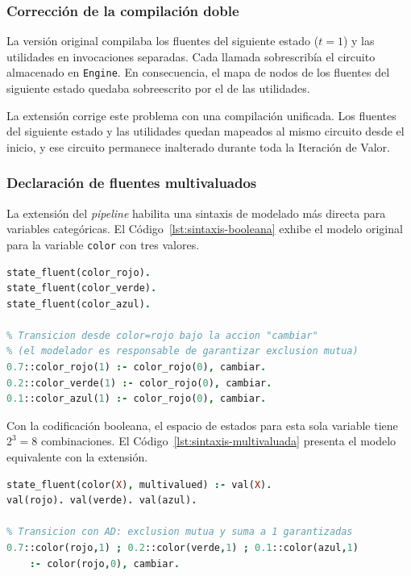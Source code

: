 \subsubsection{Corrección de la compilación doble}
\label{sec:di-compilacion-unica}

La versión original compilaba los fluentes del siguiente estado ($t = 1$) y las
utilidades en invocaciones separadas. Cada llamada sobrescribía el circuito
almacenado en \texttt{Engine}. En consecuencia, el mapa de nodos de los fluentes
del siguiente estado quedaba sobreescrito por el de las utilidades.

La extensión corrige este problema con una compilación unificada. Los fluentes
del siguiente estado y las utilidades quedan mapeados al mismo circuito desde el
inicio, y ese circuito permanece inalterado durante toda la Iteración de Valor.

\subsubsection{Declaración de fluentes multivaluados}
\label{sec:di-nueva-sintaxis}

La extensión del \textit{pipeline} habilita una sintaxis de modelado más directa
para variables categóricas. El Código~\ref{lst:sintaxis-booleana} exhibe el
modelo original para la variable \texttt{color} con tres valores.

\begin{lstlisting}[language=Prolog,
    caption={Modelado booleano de una variable categórica con tres valores.},
    label={lst:sintaxis-booleana}]
% Tres fluentes independientes
state_fluent(color_rojo).
state_fluent(color_verde).
state_fluent(color_azul).

% Transicion desde color=rojo bajo la accion "cambiar"
% (el modelador es responsable de garantizar exclusion mutua)
0.7::color_rojo(1) :- color_rojo(0), cambiar.
0.2::color_verde(1) :- color_rojo(0), cambiar.
0.1::color_azul(1) :- color_rojo(0), cambiar.
\end{lstlisting}

Con la codificación booleana, el espacio de estados para esta sola variable
tiene $2^3 = 8$ combinaciones. El Código~\ref{lst:sintaxis-multivaluada} presenta el modelo equivalente con la
extensión.

\begin{lstlisting}[language=Prolog,
    caption={Modelado de la misma variable con la extensión multivaluada.},
    label={lst:sintaxis-multivaluada}]
% Una declaracion para las tres opciones
state_fluent(color(X), multivalued) :- val(X).
val(rojo). val(verde). val(azul).

% Transicion con AD: exclusion mutua y suma a 1 garantizadas
0.7::color(rojo,1) ; 0.2::color(verde,1) ; 0.1::color(azul,1)
    :- color(rojo,0), cambiar.
\end{lstlisting}

